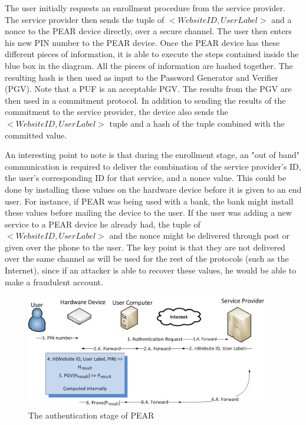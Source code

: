 The user initially requests an enrollment procedure from the service provider. The service provider then sends the tuple
of $<Website ID, User Label>$ and a nonce to the PEAR device directly, over a secure channel. The user then enters his
new PIN number to the PEAR device. Once the PEAR device has these different pieces of information, it is able to execute
the steps contained inside the blue box in the diagram. All the pieces of information are hashed together. The resulting
hash is then used as input to the Password Generator and Verifier (PGV). Note that a PUF is an acceptable PGV. The results
from the PGV are then used in a commitment protocol. In addition to sending the results of the commitment to the service
provider, the device also sends the $<Website ID, User Label>$ tuple and a hash of the tuple combined with the committed value.

An interesting point to note is that during the enrollment stage, an "out of band" communication is required to deliver
the combination of the service provider's ID, the user's corresponding ID for that service, and a nonce value. This could
be done by installing these values on the hardware device before it is given to an end user. For instance, if PEAR was being
used with a bank, the bank might install these values before mailing the device to the user. If the user was adding a new
service to a PEAR device he already had, the tuple of $<Website ID, User Label>$ and the nonce might be delivered through
post or given over the phone to the user. The key point is that they are not delivered over the same channel as will be
used for the rest of the protocols (such as the Internet), since if an attacker is able to recover these values, he would
be able to make a fraudulent account.

\begin{figure}[!ht]
\centering
\includegraphics[width=400px]{images/auth.jpg}
\caption{The authentication stage of PEAR}
\label{fig:pearauthentication}
\end{figure}
\FloatBarrier

